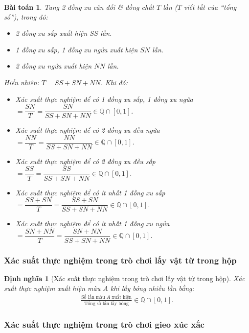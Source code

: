 \documentclass{article}
\numberwithin{equation}{section}
\newtheorem{definition}{Định nghĩa}[section]
\newtheorem{problem}{Bài toán}[section]
\begin{document}
\begin{problem}
	Tung 2 đồng xu cân đối \& đồng chất $T$ lần ($T$ viết tắt của ``tổng số''), trong đó:
	\begin{itemize}
		\item 2 đồng xu sấp xuất hiện $SS$ lần.
		\item 1 đồng xu sấp, 1 đồng xu ngửa xuất hiện $SN$ lần.
		\item 2 đồng xu ngửa xuất hiện $NN$ lần.
	\end{itemize}
	Hiển nhiên: $T = SS + SN + NN$. Khi đó:
	\begin{itemize}
		\item Xác suất thực nghiệm để có 1 đồng xu sấp, 1 đồng xu ngửa $= \dfrac{SN}{T} = \dfrac{SN}{SS + SN + NN}\in\mathbb{Q}\cap[0,1]$.
		\item Xác suất thực nghiệm để có 2 đồng xu đều ngửa $= \dfrac{NN}{T} = \dfrac{NN}{SS + SN + NN}\in\mathbb{Q}\cap[0,1]$.
		\item Xác suất thực nghiệm để có 2 đồng xu đều sấp $= \dfrac{SS}{T} = \dfrac{SS}{SS + SN + NN}\in\mathbb{Q}\cap[0,1]$.
		\item Xác suất thực nghiệm để có ít nhất 1 đồng xu sấp $= \dfrac{SS + SN}{T} = \dfrac{SS + SN}{SS + SN + NN}\in\mathbb{Q}\cap[0,1]$.
		\item Xác suất thực nghiệm để có ít nhất 1 đồng xu ngửa $= \dfrac{SN + NN}{T} = \dfrac{SN + NN}{SS + SN + NN}\in\mathbb{Q}\cap[0,1]$.
	\end{itemize}
\end{problem}

\subsubsection{Xác suất thực nghiệm trong trò chơi lấy vật từ trong hộp}

\begin{definition}[Xác suất thực nghiệm trong trò chơi lấy vật từ trong hộp]
	\emph{Xác suất thực nghiệm xuất hiện màu $A$} khi lấy bóng nhiều lần bằng:
	\begin{align*}
		\frac{\mbox{Số lần màu $A$ xuất hiện}}{\mbox{Tổng số lần lấy bóng}}\in\mathbb{Q}\cap[0,1].
	\end{align*}
\end{definition}

\subsubsection{Xác suất thực nghiệm trong trò chơi gieo xúc xắc}
\end{document}
